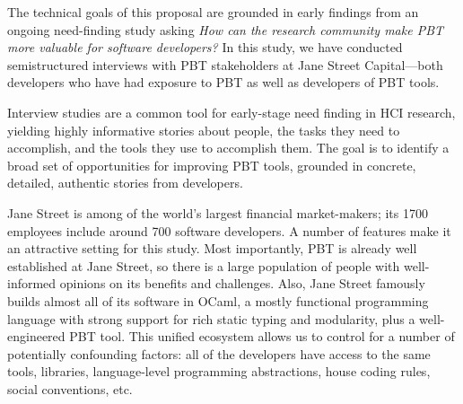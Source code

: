 

\iflater{}\fi

\label{sec:motivation}
%
The technical goals of this proposal are grounded in early
findings from an ongoing need-finding study asking {\em How can the
  research community make PBT more valuable for software developers?}
%
\iflater {}\fi
%
%
In this study, we have conducted semistructured interviews with
PBT stakeholders at Jane
Street Capital---both
developers who have had exposure to PBT as
well as developers of PBT tools.

Interview
studies are a common tool for early-stage need finding in
HCI research, yielding highly informative stories about people, the tasks they need to
accomplish, and the tools they use to accomplish them. The goal
is to identify a broad set of opportunities for improving PBT tools,
grounded in concrete, detailed, authentic stories from developers.

Jane Street is among of the world's largest
financial market-makers; its 1700 employees
include around 700 software developers.  A number of features make
it an attractive setting for this study.  Most importantly, PBT is
already well established at Jane Street, so there is a large
population of people with well-informed opinions on its benefits and
challenges.  Also, Jane Street famously builds almost all of its
software in OCaml, a mostly functional programming language with
strong support for rich static typing and modularity, plus a well-engineered
PBT tool. This unified
ecosystem allows us to control for a number of potentially confounding
factors: all of the developers have access to the same tools,
libraries, language-level programming abstractions, house coding
rules, social conventions, etc.

%

